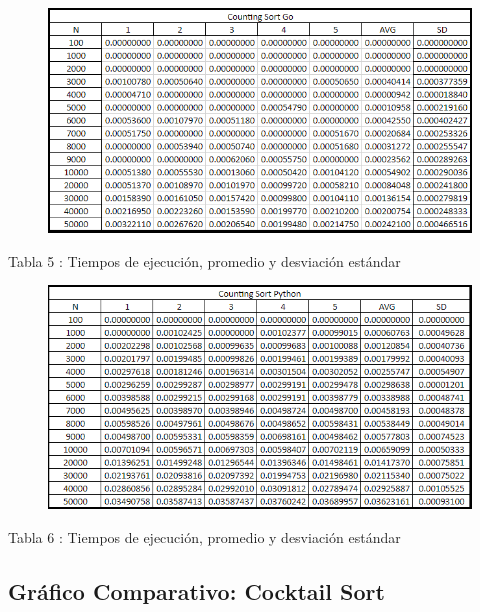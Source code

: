 \documentclass[https://www.overleaf.com/project/63761df255a8a9f4a15c3579
	letterpaper, %
	10pt, %
]{CSUniSchoolLabReport}
\begin{document}
\begin{figure}[H] 
	\centering 
	\includegraphics[width=1\textwidth]{Figures/5.png} %
\end{figure}
\begin{center}
    Tabla 5 : Tiempos de ejecución, promedio y desviación estándar
\end{center}

\begin{figure}[H] 
	\centering 
	\includegraphics[width=1\textwidth]{Figures/6.png} %
\end{figure}
\begin{center}
    Tabla 6 : Tiempos de ejecución, promedio y desviación estándar
\end{center}

\subsection{Gráfico Comparativo: Cocktail Sort}
\end{document}
